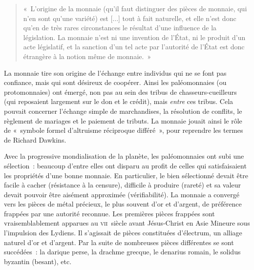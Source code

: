 \begin{quote}
«~L'origine de la monnaie (qu'il faut distinguer des pièces de monnaie, qui n'en sont qu'une variété) est [...] tout à fait naturelle, et elle n'est donc qu'en de très rares circonstances le résultat d'une influence de la législation. La monnaie n'est ni une invention de l'État, ni le produit d'un acte législatif, et la sanction d'un tel acte par l'autorité de l'État est donc étrangère à la notion même de monnaie.~»
\end{quote} %

La monnaie tire son origine de l'échange entre individus qui ne se font pas confiance, mais qui sont désireux de coopérer. Ainsi les paléomonnaies (ou protomonnaies) ont émergé, non pas au sein des tribus de chasseurs-cueilleurs (qui reposaient largement sur le don et le crédit), mais \emph{entre} ces tribus. Cela pouvait concerner l'échange simple de marchandises, la résolution de conflits, le règlement de mariages et le paiement de tributs. La monnaie jouait ainsi le rôle de «~symbole formel d'altruisme réciproque différé~», pour reprendre les termes de Richard Dawkins.

Avec la progressive mondialisation de la planète, les paléomonnaies ont subi une sélection~: beaucoup d'entre elles ont disparu au profit de celles qui satisfaisaient les propriétés d'une bonne monnaie. En particulier, le bien sélectionné devait être facile à cacher (résistance à la censure), difficile à produire (rareté) et sa valeur devait pouvoir être aisément approximée (vérifiabilité). La monnaie a convergé vers les pièces de métal précieux, le plus souvent d'or et d'argent, de préférence frappées par une autorité reconnue. Les premières pièces frappées sont vraisemblablement apparues au \textsc{vii}\ieme{}~siècle avant Jésus-Christ en Asie Mineure sous l'impulsion des Lydiens. Il s'agissait de pièces constituées d'électrum, un alliage naturel d'or et d'argent. Par la suite de nombreuses pièces différentes se sont succédées~: la darique perse, la drachme grecque, le denarius romain, le solidus byzantin (besant), etc.

